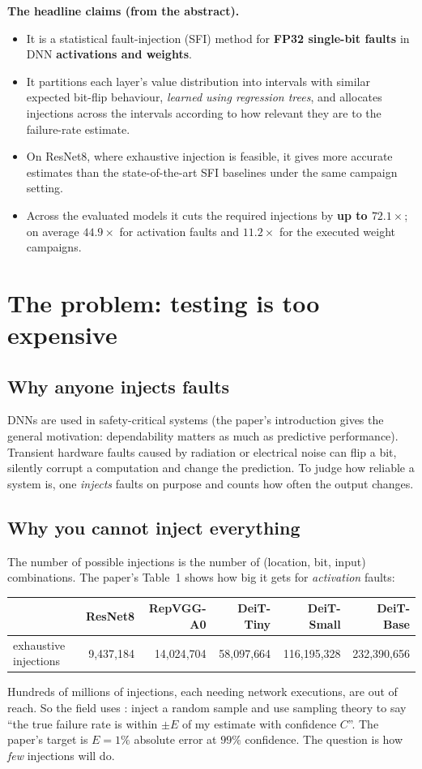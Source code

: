 \textbf{The headline claims (from the abstract).}
\begin{itemize}
\item It is a statistical fault-injection (SFI) method for \textbf{FP32 single-bit faults} in DNN \textbf{activations and weights}.
\item It partitions each layer's value distribution into intervals with similar expected bit-flip behaviour, \emph{learned using regression trees},
 and allocates injections across the intervals according to how relevant they are to the failure-rate estimate.
\item On ResNet8, where exhaustive injection is feasible, it gives more accurate estimates than the state-of-the-art SFI baselines under the same campaign setting.
\item Across the evaluated models it cuts the required injections by \textbf{up to $72.1\times$}; on average $44.9\times$ for activation faults and
 $11.2\times$ for the executed weight campaigns.
\end{itemize}

\section{The problem: testing is too expensive}

\subsection{Why anyone injects faults}
DNNs are used in safety-critical systems (the paper's introduction gives the general motivation: dependability matters as much as predictive
performance). Transient hardware faults caused by radiation or electrical noise can flip a bit, silently corrupt a computation and change the prediction.
To judge how reliable a system is, one \emph{injects} faults on purpose and counts how often the output changes.

\subsection{Why you cannot inject everything}
The number of possible injections is the number of (location, bit, input) combinations. The paper's Table~1 shows how big it gets for
\emph{activation} faults:
\begin{center}
\small
\begin{tabular}{lrrrrr}
\toprule
 & ResNet8 & RepVGG-A0 & DeiT-Tiny & DeiT-Small & DeiT-Base \\
\midrule
exhaustive injections & 9{,}437{,}184 & 14{,}024{,}704 & 58{,}097{,}664 & 116{,}195{,}328 & 232{,}390{,}656 \\
\bottomrule
\end{tabular}
\end{center}
Hundreds of millions of injections, each needing network executions, are out of reach. So the field uses :
inject a random sample and use sampling theory to say ``the true failure rate is within $\pm E$ of my estimate with confidence $C$''. The paper's target is
$E=1\%$ absolute error at $99\%$ confidence. The question is how \emph{few} injections will do.

